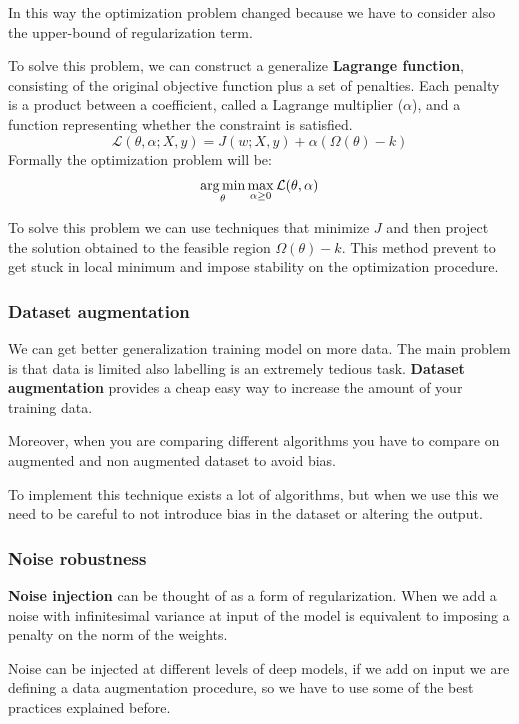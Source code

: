 In this way the optimization problem changed because we have to consider also
the upper-bound of regularization term.

To solve this problem, we can construct a generalize \textbf{Lagrange function},
consisting of the original objective function plus a set of penalties. Each
penalty is a product between a coefficient, called a Lagrange multiplier ($\alpha$),
and a function representing whether the constraint is satisfied.
\begin{equation}
    \mathcal{L}(\theta, \alpha; X,y) = J(w;X,y)+ \alpha(\Omega(\theta)-k)
\end{equation}
Formally the optimization problem will be:
\begin{equation}
    \operatorname*{arg\,min}_\theta \max_{\alpha \geq 0} \mathcal{L}(\theta, \alpha)
\end{equation}

To solve this problem we can use techniques that minimize $J$ and then project
the solution obtained to the feasible region $\Omega(\theta) - k$. This method
prevent to get stuck in local minimum and impose stability on the optimization
procedure.
\subsubsection{Dataset augmentation}
We can get better generalization training model on more data. The main problem is
that data is limited also labelling is an extremely tedious task. \textbf{Dataset
    augmentation} provides a cheap easy way to increase the amount of your
training data.

Moreover, when you are comparing different algorithms you have to compare on
augmented and non augmented dataset to avoid bias.

To implement this technique exists a lot of algorithms, but when we use this
we need to be careful to not introduce bias in the dataset or altering the output.
\subsubsection{Noise robustness}
\textbf{Noise injection} can be thought of as a form of regularization. When we
add a noise with infinitesimal variance at input of the model is equivalent to
imposing a penalty on the norm of the weights.

Noise can be injected at different levels of deep models, if we add on input we
are defining a data augmentation procedure, so we have to use some of the best
practices explained before.

